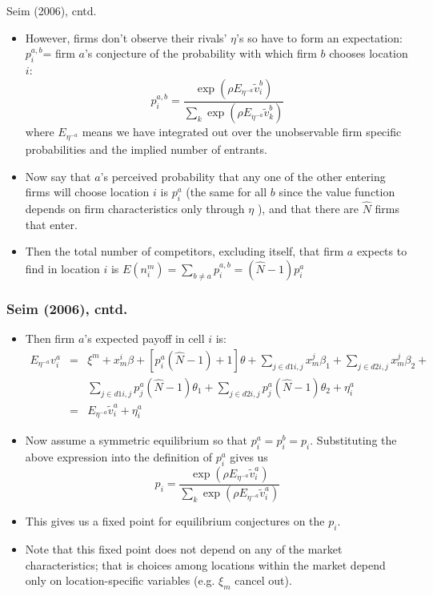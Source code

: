 \documentclass[aspectratio=169,11pt]{beamer}
\begin{document}
\begin{frame}{Seim (2006), cntd.}
\footnotesize
\begin{itemize}
\item However, firms don't observe their rivals' $\eta $'s so have to form
an expectation:\ $p_{i}^{a,b}$= firm $a$'s conjecture of the probability
with which firm $b$ chooses location $i$:%
\begin{equation*}
p_{i}^{a,b}=\frac{\exp (\rho E_{\eta ^{-a}}\tilde{v}_{i}^{b})}{\sum_{k}\exp
(\rho E_{\eta ^{-a}}\tilde{v}_{k}^{b})}
\end{equation*}%
where $E_{\eta ^{-a}}$ means we have integrated out over the unobservable
firm specific probabilities and the implied number of entrants.

\item Now say that $a$'s perceived probability that any one of the other
entering firms will choose location $i$ is $p_{i}^{a}$ (the same for all $b$
since the value function depends on firm characteristics only through $\eta $%
), and that there are $\hat{N}$ firms that enter.

\item Then the total number of competitors, excluding itself, that firm $a$
expects to find in location $i$ is $E(n_{i}^{m})=\sum_{b\neq a}p_{i}^{a,b}=(%
\hat{N}-1)p_{i}^{a}$
\end{itemize}
\end{frame}

\begin{frame}
\frametitle{Seim (2006), cntd.}
\footnotesize
\begin{itemize}
\item Then firm $a$'s expected payoff in cell $i$ is: 
\begin{eqnarray*}
E_{\eta ^{-a}}v_{i}^{a} &=&\xi ^{m}+x_{m}^{i}\beta +[p_{i}^{a}(\hat{N}%
-1)+1]\theta +\sum_{j\in d1i,j}x_{m}^{j}\beta _{1}+\sum_{j\in
d2i,j}x_{m}^{j}\beta _{2}+ \\
&&\sum_{j\in d1i,j}p_{j}^{a}(\hat{N}-1)\theta _{1}+\sum_{j\in
d2i,j}p_{j}^{a}(\hat{N}-1)\theta _{2}+\eta _{i}^{a} \\
&=&E_{\eta ^{-a}}\tilde{v}_{i}^{a}+\eta _{i}^{a}
\end{eqnarray*}

\item Now assume a symmetric equilibrium so that $p_{i}^{a}=p_{i}^{b}=p_{i}.$
Substituting the above expression into the definition of $p_{i}^{a}$ gives
us 
\begin{equation*}
p_{i}=\frac{\exp (\rho E_{\eta ^{-a}}\tilde{v}_{i}^{a})}{\sum_{k}\exp (\rho
E_{\eta ^{-a}}\tilde{v}_{i}^{a})}
\end{equation*}

\item This gives us a fixed point for equilibrium conjectures on the $p_{i}$.

\item Note that this fixed point does not depend on any of the market
characteristics; that is choices among locations within the market depend
only on location-specific variables (e.g. $\xi _{m}$ cancel out).
\end{itemize}
\end{frame}
\end{document}

